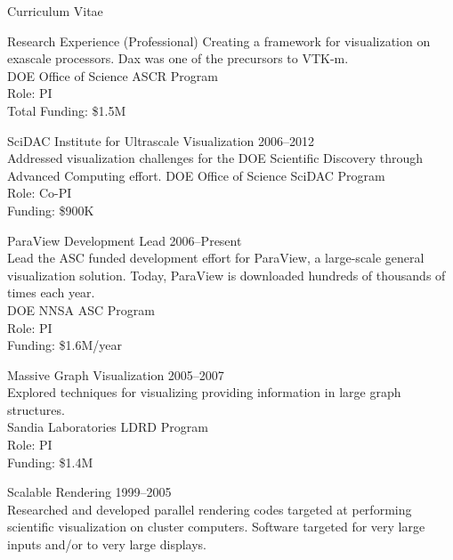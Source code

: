 \documentclass{article}
\begin{document}
\begin{cv}{Curriculum Vitae}
\begin{cvlist}{Research Experience (Professional)}
      Creating a framework for visualization on exascale processors. Dax was one of the precursors to \mbox{VTK-m}.\\
      DOE Office of Science ASCR Program\\
      Role: PI\\
      Total Funding: \$1.5M
    \item[SciDAC Institute for Ultrascale Visualization]\hfill 2006--2012\\
      Addressed visualization challenges for the DOE Scientific Discovery through Advanced Computing effort.
      DOE Office of Science SciDAC Program\\
      Role: Co-PI\\
      Funding: \$900K
    \item[ParaView Development Lead]\hfill 2006--Present\\
      Lead the ASC funded development effort for ParaView, a large-scale
      general visualization solution. Today, ParaView is downloaded hundreds of thousands of times each year.\\
      DOE NNSA ASC Program\\
      Role: PI\\
      Funding: \$1.6M/year %
    \item[Massive Graph Visualization]\hfill 2005--2007 \\
      Explored techniques for visualizing providing information in large
      graph structures.\\
      Sandia Laboratories LDRD Program\\
      Role: PI\\
      Funding: \$1.4M
    \item[Scalable Rendering]\hfill 1999--2005 \\
      Researched and developed parallel rendering codes targeted at performing scientific visualization on cluster computers.  Software targeted for very large inputs and/or to very large displays.\\

\end{cvlist}
\end{cv}
\end{document}
